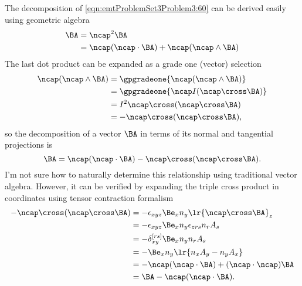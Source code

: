 %
%
The decomposition of \cref{eqn:emtProblemSet3Problem3:60} can be derived easily using geometric algebra
%
\begin{equation}\label{eqn:emtProblemSet3Problem3:80}
\begin{aligned}
\BA
&=
\ncap^2 \BA
\\ &=
\ncap (\ncap \cdot \BA)
+\ncap (\ncap \wedge \BA)
\end{aligned}
\end{equation}
%
The last dot product can be expanded as a grade one (vector) selection
%
\begin{equation}\label{eqn:emtProblemSet3Problem3:100}
\begin{aligned}
\ncap (\ncap \wedge \BA)
&=
\gpgradeone{
\ncap (\ncap \wedge \BA)
}
\\ &=
\gpgradeone{
\ncap I (\ncap \cross \BA)
}
\\ &=
I^2 \ncap \cross (\ncap \cross \BA)
\\ &=
- \ncap \cross (\ncap \cross \BA),
\end{aligned}
\end{equation}
%
so the decomposition of a vector \( \BA \) in terms of its normal and tangential projections is
\begin{equation}\label{eqn:emtProblemSet3Problem3:120}
\BA
=
\ncap (\ncap \cdot \BA)
-
\ncap \cross (\ncap \cross \BA).
\end{equation}
%
I'm not sure how to naturally determine this relationship using traditional vector algebra.  However, it can be verified by expanding the triple cross product in coordinates using tensor contraction formalism
%
\begin{equation}\label{eqn:emtProblemSet3Problem3:140}
\begin{aligned}
-\ncap \cross (\ncap \cross \BA)
&=
-\epsilon_{xyz} \Be_x n_y \lr{\ncap \cross \BA}_z
\\ &=
-\epsilon_{xyz} \Be_x n_y \epsilon_{zrs} n_r A_s
\\ &=
-\delta_{xy}^{[rs]}
\Be_x n_y n_r A_s
\\ &=
-\Be_x n_y \lr{ n_x A_y -n_y A_x }
\\ &= -\ncap (\ncap \cdot \BA) + (\ncap \cdot \ncap) \BA
\\ &= \BA - \ncap (\ncap \cdot \BA).
\end{aligned}
\end{equation}
